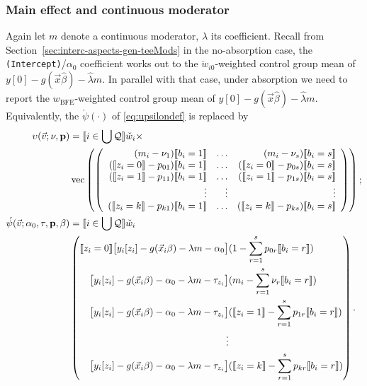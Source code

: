 \documentclass{article}
\DeclarePairedDelimiter{\indicator}{\llbracket}{\rrbracket}
\newcommand{\owt}[1][{[z_{i}]}]{\ensuremath{\check{w}_{i#1}}}
\newcommand{\absorbInterceptsEF}{\upsilon}
\begin{document}
\subsubsection{Main effect and continuous moderator}
Again let $m$ denote a continuous moderator, $\lambda$ its
coefficient. Recall from Section~\ref{sec:interc-aspects-gen-teeMods} in the no-absorption case, the \texttt{(Intercept)}/$\alpha_{0}$
coefficient works out to the $\owt[0]$-weighted control group mean of $y[0] - g(\vec{x}\hat\beta) -
\hat{\lambda}m$. In parallel with that case, under absorption we need to report the  $w_{\text{BFE}}$-weighted control group mean of $y[0] - g(\vec{x}\hat\beta) -
\hat{\lambda}m$. Equivalently, the $\acute{\psi}(\cdot)$ of
\eqref{eq:upsilondef} is replaced by
\begin{align}
    \absorbInterceptsEF(\vec{v}; \nu, \mathbf{p}) &=
                                             \indicator{i \in \bigcup \mathcal{Q}} \owt[] \times \nonumber \\
  &\operatorname{vec}\left(%
    \left(
    \begin{array}{rrr}
      (m_{i} - \nu_{1}) \indicator{b_{i}=1} & \ldots & 
(m_{i} - \nu_{s}) \indicator{b_{i}=s} \\
      (\indicator{z_{i}=0}-p_{01})\indicator{b_{i}=1}
      &\ldots
      &
        (\indicator{z_{i}=0}-p_{0s})\indicator{b_{i}=s}
      \\
      (\indicator{z_{i}=1}-p_{11})\indicator{b_{i}=1}
      &\ldots
      &
        (\indicator{z_{i}=1}-p_{1s})\indicator{b_{i}=s}
      \\
      \vdots & \vdots & \vdots \\
      (\indicator{z_{i}=k}-p_{k1})\indicator{b_{i}=1}
      &\ldots
      &
        (\indicator{z_{i}=k}-p_{ks})\indicator{b_{i}=s}\\                                      \end{array}
  \right)%
  \right) ;\nonumber \\
    \acute{\psi}(\vec{v}; \alpha_{0}, \tau, \mathbf{p}, \beta) &=
    \indicator{i \in \bigcup \mathcal{Q}}\owt[] \nonumber
  \\
&\left(
  \begin{aligned}                                               
    \indicator{z_{i}=0} \big[y_{i}[z_{i}]
    -
    g(\vec{x}_{i}\beta) - {\lambda}m-\alpha_{0}\big]
    &(
   1 - \sum_{r=1}^{s}p_{0r}\indicator{b_{i}=r}) \\
\big[y_{i}[z_{i}]
    -
    g(\vec{x}_{i}\beta)-\alpha_{0}- {\lambda}m-\tau_{z_{i}}\big]
    &(m_{i} - \sum_{r=1}^{s}\nu_{r}\indicator{b_{i}=r})
    \\
   \big[y_{i}[z_{i}]
    -
    g(\vec{x}_{i}\beta)-\alpha_{0}- {\lambda}m-\tau_{z_{i}}\big]
    &(
    \indicator{z_{i}=1} - \sum_{r=1}^{s}p_{1r}\indicator{b_{i}=r})\\
    \vdots \\
    {}\big[y_{i}[z_{i}]
    - g(\vec{x}_{i}\beta) - \alpha_{0}- {\lambda}m -
    \tau_{z_{i}}\big]
    &(\indicator{z_{i}=k}
    - \sum_{r=1}^{s}p_{kr}\indicator{b_{i}=r})\\
  \end{aligned}
\right) .\label{eq:30}
\end{align}
\end{document}
